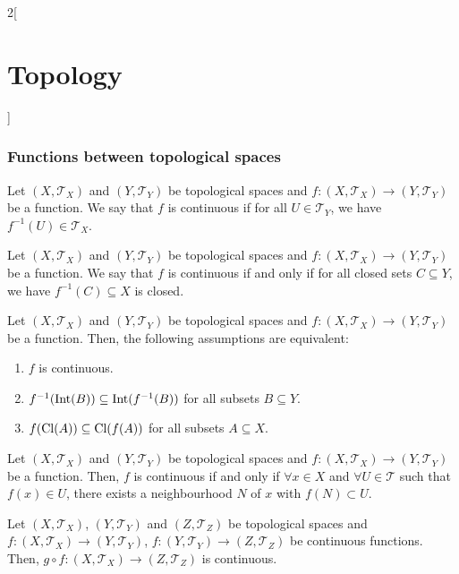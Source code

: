 \documentclass[../../../main.tex]{subfiles}
\begin{document}
\begin{multicols}{2}[\section{Topology}]
  \subsubsection{Functions between topological spaces}
  \begin{definition}
    Let $(X,\mathcal{T}_X)$ and $(Y,\mathcal{T}_Y)$ be topological spaces and $f:(X,\mathcal{T}_X)\rightarrow(Y,\mathcal{T}_Y)$ be a function. We say that $f$ is continuous if for all $U\in\mathcal{T}_Y$, we have $f^{-1}(U)\in\mathcal{T}_X$.
  \end{definition}
  \begin{prop}
    Let $(X,\mathcal{T}_X)$ and $(Y,\mathcal{T}_Y)$ be topological spaces and $f:(X,\mathcal{T}_X)\rightarrow(Y,\mathcal{T}_Y)$ be a function. We say that $f$ is continuous if and only if for all closed sets $C\subseteq Y$, we have $f^{-1}(C)\subseteq X$ is closed.
  \end{prop}
  \begin{theorem}
    Let $(X,\mathcal{T}_X)$ and $(Y,\mathcal{T}_Y)$ be topological spaces and $f:(X,\mathcal{T}_X)\rightarrow (Y,\mathcal{T}_Y)$ be a function. Then, the following assumptions are equivalent:
    \begin{enumerate}
      \item $f$ is continuous.
      \item $f^{-1}(\operatorname{Int}(B))\subseteq \operatorname{Int}(f^{-1}(B))$ for all subsets $B\subseteq Y$.
      \item $f(\operatorname{Cl}(A))\subseteq \operatorname{Cl}(f(A))$ for all subsets $A\subseteq X$.
    \end{enumerate}
  \end{theorem}
  \begin{theorem}
    Let $(X,\mathcal{T}_X)$ and $(Y,\mathcal{T}_Y)$ be topological spaces and $f:(X,\mathcal{T}_X)\rightarrow (Y,\mathcal{T}_Y)$ be a function. Then, $f$ is continuous if and only if $\forall x\in X$ and $\forall U\in\mathcal{T}$ such that $f(x)\in U$, there exists a neighbourhood $N$ of $x$ with $f(N)\subset U$.
  \end{theorem}
  \begin{prop}
    Let $(X,\mathcal{T}_X)$, $(Y,\mathcal{T}_Y)$ and $(Z,\mathcal{T}_Z)$ be topological spaces and $f:(X,\mathcal{T}_X)\rightarrow (Y,\mathcal{T}_Y)$, $f:(Y,\mathcal{T}_Y)\rightarrow (Z,\mathcal{T}_Z)$ be continuous functions. Then, $g\circ f:(X,\mathcal{T}_X)\rightarrow (Z,\mathcal{T}_Z)$ is continuous.
  \end{prop}
  \begin{definition}

\end{definition}
\end{multicols}
\end{document}
